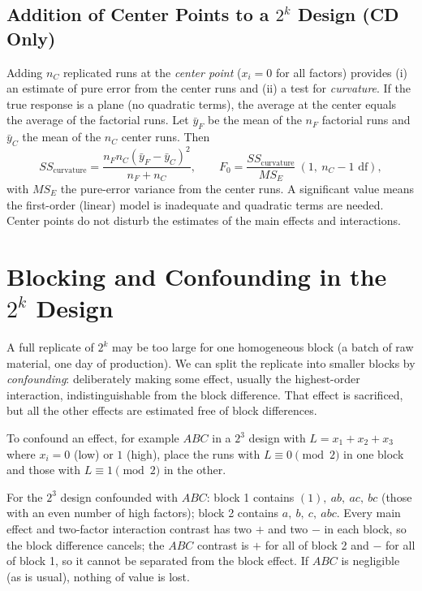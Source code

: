 \subsection{Addition of Center Points to a $2^k$ Design (CD Only)}

Adding $n_C$ replicated runs at the \emph{center point} ($x_i=0$ for all factors) provides (i) an estimate of pure error from the center runs and (ii) a test for \emph{curvature}. If the true response is a plane (no quadratic terms), the average at the center equals the average of the factorial runs. Let $\bar{y}_F$ be the mean of the $n_F$ factorial runs and $\bar{y}_C$ the mean of the $n_C$ center runs. Then
\[ SS_{\text{curvature}}=\frac{n_Fn_C(\bar{y}_F-\bar{y}_C)^2}{n_F+n_C},\qquad F_0=\frac{SS_{\text{curvature}}}{MS_E}\ (1,\ n_C-1\text{ df}), \]
with $MS_E$ the pure-error variance from the center runs. A significant value means the first-order (linear) model is inadequate and quadratic terms are needed. Center points do not disturb the estimates of the main effects and interactions.

\section{Blocking and Confounding in the $2^k$ Design}

A full replicate of $2^k$ may be too large for one homogeneous block (a batch of raw material, one day of production). We can split the replicate into smaller blocks by \emph{confounding}: deliberately making some effect, usually the highest-order interaction, indistinguishable from the block difference. That effect is sacrificed, but all the other effects are estimated free of block differences.

\begin{definition}
To confound an effect, for example $ABC$ in a $2^3$ design with $L=x_1+x_2+x_3$ where $x_i=0$ (low) or $1$ (high), place the runs with $L\equiv0\pmod2$ in one block and those with $L\equiv1\pmod2$ in the other.
\end{definition}

\begin{example}
For the $2^3$ design confounded with $ABC$: block 1 contains $(1),\ ab,\ ac,\ bc$ (those with an even number of high factors); block 2 contains $a,\ b,\ c,\ abc$. Every main effect and two-factor interaction contrast has two $+$ and two $-$ in each block, so the block difference cancels; the $ABC$ contrast is $+$ for all of block 2 and $-$ for all of block 1, so it cannot be separated from the block effect. If $ABC$ is negligible (as is usual), nothing of value is lost.
\end{example}

